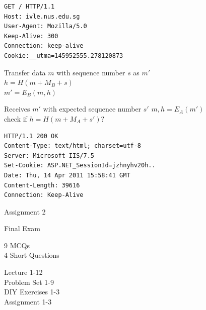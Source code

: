 

\begin{frame}[fragile]\footnotesize
\begin{verbatim}
GET / HTTP/1.1
Host: ivle.nus.edu.sg
User-Agent: Mozilla/5.0 
Keep-Alive: 300
Connection: keep-alive
Cookie:__utma=145952555.278120873
\end{verbatim}
\end{frame}

\begin{cf}
	Transfer data $m$ with sequence number $s$ as $m'$\\
  \vspace{1cm}
	$h = H(m + M_B + s)$\\
	$m' = E_B (m, h)$\\
\end{cf}


\begin{cf}
	Receives $m'$ with expected sequence number $s'$
  \vspace{1cm}
	$m, h = E_A(m')$\\
	check if $h = H(m + M_A + s') ?$\\
\end{cf}

\begin{frame}[fragile]\footnotesize
\begin{verbatim}
HTTP/1.1 200 OK
Content-Type: text/html; charset=utf-8
Server: Microsoft-IIS/7.5
Set-Cookie: ASP.NET_SessionId=jzhnyhv20h..
Date: Thu, 14 Apr 2011 15:58:41 GMT
Content-Length: 39616
Connection: Keep-Alive
\end{verbatim}
\end{frame}



\begin{cf}
	Assignment 2
\end{cf}

\begin{cf}
	Final Exam
\end{cf}

\begin{cf}
	9 MCQs\\
	4 Short Questions\\
\end{cf}

\begin{cf}
	Lecture 1-12\\
	Problem Set 1-9\\
	DIY Exercises 1-3\\
	Assignment 1-3\\
\end{cf}

